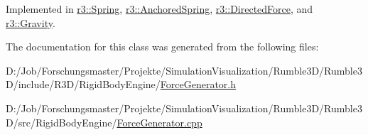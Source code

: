 Implemented in \mbox{\hyperlink{classr3_1_1_spring_a3305adfd568606ed9ae6fb589f20446b}{r3\+::\+Spring}}, \mbox{\hyperlink{classr3_1_1_anchored_spring_a3e928bc7fdedc8eb5b302a007200a58c}{r3\+::\+Anchored\+Spring}}, \mbox{\hyperlink{classr3_1_1_directed_force_ac723ddeef767956d16fb9d0a1d706bfd}{r3\+::\+Directed\+Force}}, and \mbox{\hyperlink{classr3_1_1_gravity_ae3152c6a922ffa193aee362e161cd4a9}{r3\+::\+Gravity}}.



The documentation for this class was generated from the following files\+:\begin{DoxyCompactItemize}
\item 
D\+:/\+Job/\+Forschungsmaster/\+Projekte/\+Simulation\+Visualization/\+Rumble3\+D/\+Rumble3\+D/include/\+R3\+D/\+Rigid\+Body\+Engine/\mbox{\hyperlink{_force_generator_8h}{Force\+Generator.\+h}}\item 
D\+:/\+Job/\+Forschungsmaster/\+Projekte/\+Simulation\+Visualization/\+Rumble3\+D/\+Rumble3\+D/src/\+Rigid\+Body\+Engine/\mbox{\hyperlink{_force_generator_8cpp}{Force\+Generator.\+cpp}}\end{DoxyCompactItemize}
